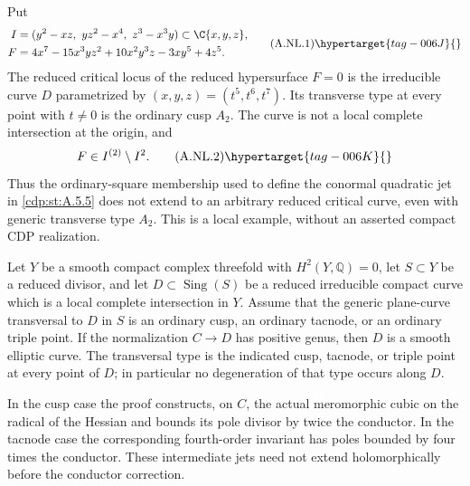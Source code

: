 
\begin{proposition}\hypertarget{tag-01AK}{}\label{cdp:st:A.2.6}


Put
\[
 \begin{aligned}
 I&=(y^2-xz,\ yz^2-x^4,\ z^3-x^3y)\subset\C\{x,y,z\},\\
 F&=4x^7-15x^3yz^2+10x^2y^3z-3xy^5+4z^5.
 \end{aligned}                                                   \tag{A.NL.1}\hypertarget{tag-006J}{}\label{cdp:eq:A.NL.1}
\]
The reduced critical locus of the reduced hypersurface $F=0$ is the
irreducible curve $D$ parametrized by $(x,y,z)=(t^5,t^6,t^7)$.
Its transverse type at every point with $t\ne0$ is the ordinary cusp
$A_2$. The curve is not a local complete intersection at the origin,
and
\[
             F\in I^{(2)}\setminus I^2.                         \tag{A.NL.2}\hypertarget{tag-006K}{}\label{cdp:eq:A.NL.2}
\]
Thus the ordinary-square membership used to define the conormal
quadratic jet in \ref{cdp:st:A.5.5} does not extend to an arbitrary reduced
critical curve, even with generic transverse type $A_2$.
This is a local example, without an asserted compact CDP realization.
\end{proposition}

\begin{proposition}\hypertarget{tag-01BF}{}\label{cdp:st:A.5.5}


Let $Y$ be a smooth compact complex threefold with
$H^2(Y,\mathbb Q)=0$, let $S\subset Y$ be a reduced divisor,
and let $D\subset\operatorname{Sing}(S)$ be a reduced
irreducible compact curve which is a local complete intersection
in $Y$. Assume that the generic plane-curve transversal to $D$
in $S$ is an ordinary cusp, an ordinary tacnode, or an ordinary
triple point.
If the normalization $C\to D$ has positive genus, then $D$ is
a smooth elliptic curve. The transversal type is the indicated
cusp, tacnode, or triple point at every point of $D$;
in particular no degeneration of that type occurs along $D$.

In the cusp case the proof constructs, on $C$, the actual
meromorphic cubic on the radical of the Hessian and bounds its
pole divisor by twice the conductor. In the tacnode case the
corresponding fourth-order invariant has poles bounded by four
times the conductor. These intermediate jets need not extend
holomorphically before the conductor correction.
\end{proposition}

